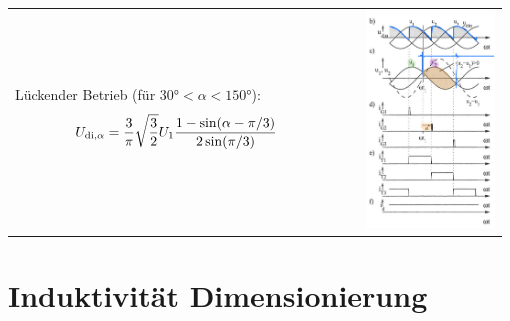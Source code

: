\documentclass[10pt,landscape]{scrartcl}
\begin{document}
\begin{multicols}{2}
\begin{tabular}{b{0.69\linewidth} p{0.29\linewidth}}
    Lückender Betrieb (für $\ang{30}<\alpha<\ang{150}$):
    {\begin{align*}
      U_{\textup{di,}\alpha}&=\frac{3}{\pi}\sqrt{\frac{3}{2}} U_1 \frac{1-\sin(\alpha-\pi/3)}{2\sin(\pi/3)}
    \end{align*}}
  &
  \includegraphics[width=\linewidth]{img/3p/graph2.png}%
\end{tabular}
  


\vfill\null
\columnbreak
\section{Induktivität Dimensionierung}


\end{multicols}
\end{document}
